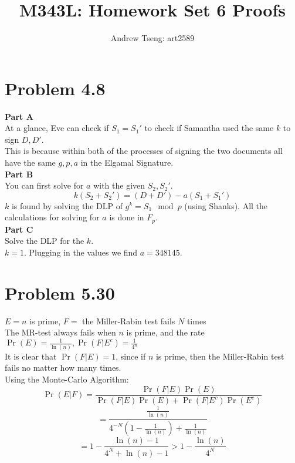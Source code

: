 \documentclass[10pt]{amsart}
\title{M343L: Homework Set 6 Proofs}
\author{Andrew Tseng: art2589}
\begin{document}
\maketitle
\thispagestyle{empty}

\section*{\large \textbf{Problem 4.8}}

\noindent \textbf{\small Part A} \\
At a glance, Eve can check if $S_{1} = S_{1}'$ to check if Samantha used the
same $k$ to sign $D,D'$. \\ This is because within both of the processes of
signing the two documents all have the same $g,p,a$ in the Elgamal Signature. \\

\noindent \textbf{\small Part B} \\
You can first solve for $a$ with the given  $S_{2}, S_{2}'$.
\[k(S_{2} +S_{2}') = (D + D') - a(S_{1} + S_{1}')\]
$k$ is found by solving the DLP of $g^k = S_{1} \mod p$ (using Shanks).
All the calculations for solving for $a$ is done in $F_{p}$.
\\

\noindent \textbf{\small Part C} \\
Solve the DLP for the $k$.\\
$k = 1$.
Plugging in the values we find $a = 348145$.\\

\section*{\large \textbf{Problem 5.30}}
\noindent$E = n$ is prime, $F = $ the Miller-Rabin test fails $N$ times \\
The MR-test always fails when $n$ is prime, and the rate 
$\Pr(E) = \frac{1}{\ln(n)}, \Pr(F|E^c) = \frac{1}{4^n}$ \\
It is clear that $\Pr(F | E) = 1$, since if $n$ is prime, then the Miller-Rabin
test fails no matter how many times.\\

Using the Monte-Carlo Algorithm:
\[\Pr(E | F) = \frac{\Pr(F|E)\Pr(E)}{\Pr(F|E)\Pr(E) + \Pr(F|E^c)\Pr(E^c)} \]
\[ = \frac {\frac{1}{\ln(n)}} {4^{-N}(1 - \frac{1}{\ln(n)}) + \frac{1}{\ln(n)}} \]
\[ = 1 - \frac{\ln(n) - 1}{4^N + \ln(n) - 1} > 1 - \frac{\ln(n)}{4^N}\]
\\
\end{document}
